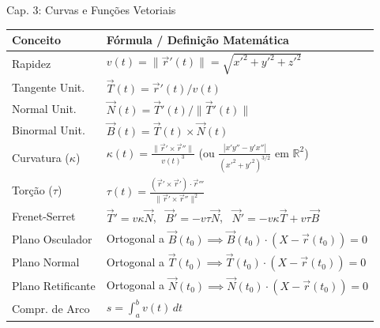 \documentclass[11pt,a4paper]{article}
\newcommand{\R}{\mathbb{R}}
\begin{document}
\begin{definitionbox}[breakable, left=4pt, right=4pt, top=4pt, bottom=4pt, boxrule=0.6pt, colframe=accentColor]{Cap. 3: Curvas e Funções Vetoriais}
  \def\arraystretch{1.2}
  \begin{tabular}{|p{2.5cm}|p{14.1cm}|}
    \hline
    \textbf{Conceito} & \textbf{Fórmula / Definição Matemática} \\ \hline
    Rapidez & $v(t) = \|\vec{r}'(t)\| = \sqrt{x'^2 + y'^2 + z'^2}$ \\ \hline
    Tangente Unit. & $\vec{T}(t) = \vec{r}'(t) / v(t)$ \\ \hline
    Normal Unit. & $\vec{N}(t) = \vec{T}'(t) / \|\vec{T}'(t)\|$ \\ \hline
    Binormal Unit. & $\vec{B}(t) = \vec{T}(t) \times \vec{N}(t)$ \\ \hline
    Curvatura ($\kappa$) & $\kappa(t) = \frac{\|\vec{r}' \times \vec{r}''\|}{v(t)^3}$ (ou $\frac{|x'y''-y'x''|}{(x'^2+y'^2)^{3/2}}$ em $\R^2$) \\ \hline
    Torção ($\tau$) & $\tau(t) = \frac{(\vec{r}' \times \vec{r}') \cdot \vec{r}'''}{\|\vec{r}' \times \vec{r}''\|^2}$ \\ \hline
    Frenet-Serret & $\vec{T}' = v\kappa\vec{N}$, \ $\vec{B}' = -v\tau\vec{N}$, \ $\vec{N}' = -v\kappa\vec{T} + v\tau\vec{B}$ \\ \hline
    Plano Osculador & Ortogonal a $\vec{B}(t_0) \implies \vec{B}(t_0) \cdot (X - \vec{r}(t_0)) = 0$ \\ \hline
    Plano Normal & Ortogonal a $\vec{T}(t_0) \implies \vec{T}(t_0) \cdot (X - \vec{r}(t_0)) = 0$ \\ \hline
    Plano Retificante & Ortogonal a $\vec{N}(t_0) \implies \vec{N}(t_0) \cdot (X - \vec{r}(t_0)) = 0$ \\ \hline
    Compr. de Arco & $s = \int_a^b v(t)\,dt$ \\ \hline
  \end{tabular}
\end{definitionbox}
\end{document}
